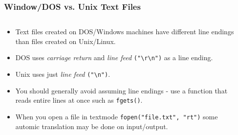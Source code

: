 
\begin{frame}[fragile]
\frametitle{Window/DOS vs. Unix Text Files}
\begin{columns}[T]


\begin{column}{0.45\textwidth}
\begin{itemize}[<+->]
\item Text files created on DOS/Windows machines have different line endings than files created on Unix/Linux.
\item DOS uses {\em carriage return} and {\em line feed} \verb^("\r\n")^ as a line ending.
\item Unix uses just {\em line feed} \verb^("\n")^.
\item You should generally avoid assuming line endings - use a function that reads entire lines at once such as \verb^fgets()^.
\item When you open a file in textmode \verb^fopen("file.txt", "rt")^ some automic translation may be done on input/output.
\end{itemize}
\end{column}

\pause
\begin{column}{0.45\textwidth}

\end{column}

\end{columns}
\end{frame}


\endinput

